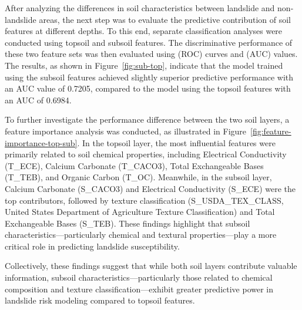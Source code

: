 After analyzing the differences in soil characteristics between landslide and non-landslide areas, the next step was to evaluate the predictive contribution of soil features at different depths. To this end, separate classification analyses were conducted using topsoil and subsoil features. The discriminative performance of these two feature sets was then evaluated using (ROC) curves and (AUC) values. The results, as shown in Figure~\ref{fig:sub-top}, indicate that the model trained using the subsoil features achieved slightly superior predictive performance with an AUC value of 0.7205, compared to the model using the topsoil features with an AUC of 0.6984.

To further investigate the performance difference between the two soil layers, a feature importance analysis was conducted, as illustrated in Figure~\ref{fig:feature-importance-top-sub}. In the topsoil layer, the most influential features were primarily related to soil chemical properties, including Electrical Conductivity (T\_ECE), Calcium Carbonate (T\_CACO3), Total Exchangeable Bases (T\_TEB), and Organic Carbon (T\_OC). Meanwhile, in the subsoil layer, Calcium Carbonate (S\_CACO3) and Electrical Conductivity (S\_ECE) were the top contributors, followed by texture classification (S\_USDA\_TEX\_CLASS, United States Department of Agriculture Texture Classification) and Total Exchangeable Bases (S\_TEB). These findings highlight that subsoil characteristics—particularly chemical and textural properties—play a more critical role in predicting landslide susceptibility.

Collectively, these findings suggest that while both soil layers contribute valuable information, subsoil characteristics—particularly those related to chemical composition and texture classification—exhibit greater predictive power in landslide risk modeling compared to topsoil features.

